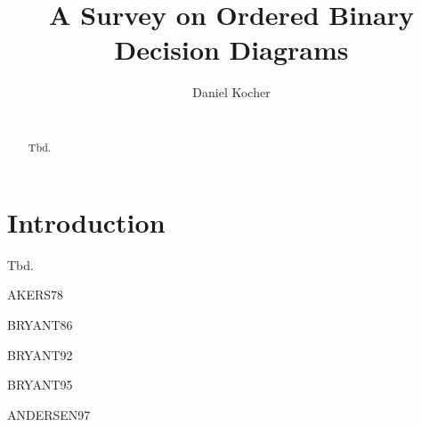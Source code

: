 \documentclass{vldb}
\begin{document}
\title{A Survey on Ordered Binary Decision Diagrams}


\author{
\alignauthor
	Daniel Kocher\\
    \\
}

\maketitle

\begin{abstract}
Tbd.
\end{abstract}

\section{Introduction}   
Tbd. \newline

\noindent AKERS78\cite{AKERS78} \newline

BRYANT86\cite{BRYANT86} \newline

\noindent BRYANT92\cite{BRYANT92} \newline

BRYANT95\cite{BRYANT95} \newline

\noindent ANDERSEN97\cite{ANDERSEN97} \newline


\balance



\end{document}
